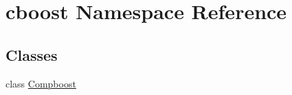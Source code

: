 \hypertarget{namespacecboost}{}\section{cboost Namespace Reference}
\label{namespacecboost}
\subsection*{Classes}
\begin{DoxyCompactItemize}
\item 
class \mbox{\hyperlink{classcboost_1_1_compboost}{Compboost}}
\end{DoxyCompactItemize}
